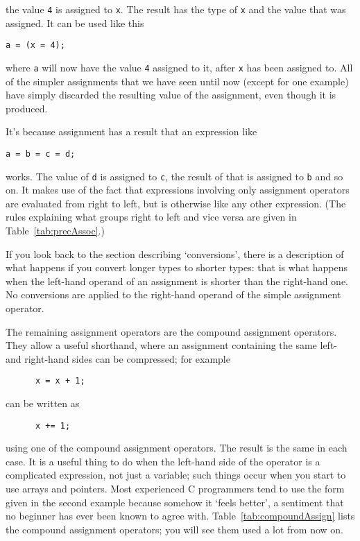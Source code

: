     the value \texttt{4} is assigned to \texttt{x}. The
     result has the type of \texttt{x} and the value that was
     assigned. It can be used like this


    \begin{Verbatim}
a = (x = 4);
\end{Verbatim}

    where \texttt{a} will now have the value \texttt{4}
     assigned to it, after \texttt{x} has been assigned to. All of
     the simpler assignments that we have seen until now (except for one
     example) have simply discarded the resulting value of the assignment,
     even though it is produced.


    It's because assignment has a result that an expression like


    \begin{Verbatim}
a = b = c = d;
\end{Verbatim}

    works. The value of \texttt{d} is assigned
     to \texttt{c}, the result of that is assigned
     to \texttt{b} and so on. It makes use of the fact that
     expressions involving only assignment operators are evaluated from right
     to left, but is otherwise like any other expression. (The rules
     explaining what groups right to left and vice versa are given in
     Table~\ref{tab:precAssoc}.)


    If you look back to the section describing `conversions', there
     is a description of what happens if you convert longer types to shorter
     types: that is what happens when the left-hand operand of an assignment
     is shorter than the right-hand one. No conversions are applied to the
     right-hand operand of the simple assignment operator.


    The remaining assignment operators are the compound assignment
     operators. They allow a useful shorthand, where an assignment containing
     the same left- and right-hand sides can be compressed; for example


    \begin{Verbatim}
      x = x + 1;
    \end{Verbatim}

    can be written as


    \begin{Verbatim}
      x += 1;
    \end{Verbatim}

    using one of the compound assignment operators. The result is the same
     in each case. It is a useful thing to do when the left-hand side of the
     operator is a complicated expression, not just a variable; such things
     occur when you start to use arrays and pointers. Most experienced C
     programmers tend to use the form given in the second example because
     somehow it `feels better', a sentiment that no beginner has ever
     been known to agree with. Table~\ref{tab:compoundAssign} lists the compound
     assignment operators; you will see them used a lot from now on.


